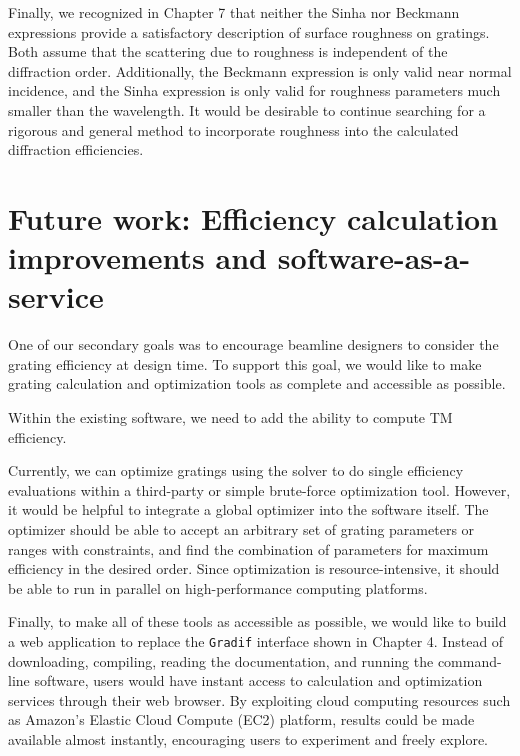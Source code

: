 Finally, we recognized in Chapter 7 that neither the Sinha nor Beckmann expressions provide a satisfactory description of surface roughness on gratings.  Both assume that the scattering due to roughness is independent of the diffraction order.  Additionally, the Beckmann expression is only valid near normal incidence, and the Sinha expression is only valid for roughness parameters much smaller than the wavelength.  It would be desirable to continue searching for a rigorous and general method to incorporate roughness into the calculated diffraction efficiencies.

\section{Future work: Efficiency calculation improvements and software-as-a-service}
One of our secondary goals was to encourage beamline designers to consider the grating efficiency at design time.  To support this goal, we would like to make grating calculation and optimization tools as complete and accessible as possible.

Within the existing software, we need to add the ability to compute TM efficiency.

Currently, we can optimize gratings using the solver to do single efficiency evaluations within a third-party or simple brute-force optimization tool.  However, it would be helpful to integrate a global optimizer into the software itself.  The optimizer should be able to accept an arbitrary set of grating parameters or ranges with constraints, and find the combination of parameters for maximum efficiency in the desired order.  Since optimization is resource-intensive, it should be able to run in parallel on high-performance computing platforms.

Finally, to make all of these tools as accessible as possible, we would like to build a web application to replace the \texttt{Gradif} interface shown in Chapter 4.  Instead of downloading, compiling, reading the documentation, and running the command-line software, users would have instant access to calculation and optimization services through their web browser.  By exploiting cloud computing resources such as Amazon's Elastic Cloud Compute (EC2) platform, results could be made available almost instantly, encouraging users to experiment and freely explore.
